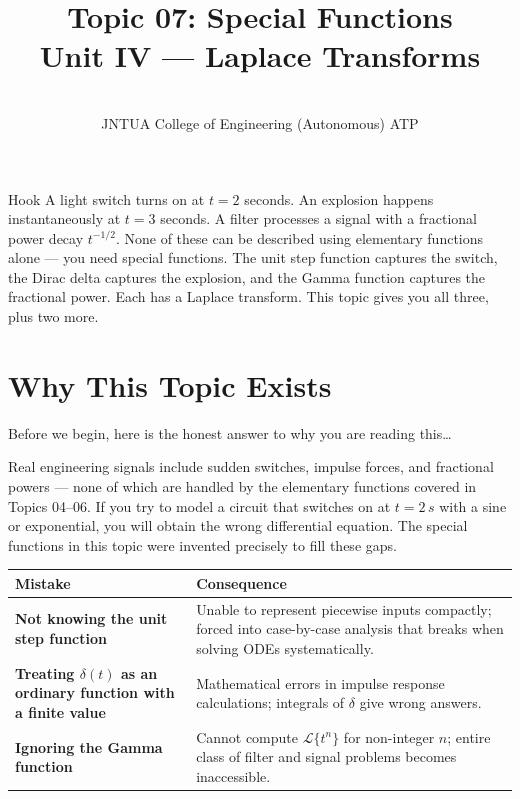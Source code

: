 \documentclass[12pt,a4paper]{article}
\title{Topic 07: Special Functions \\ \large Unit IV --- Laplace Transforms}
\author{ \\
        JNTUA College of Engineering (Autonomous) ATP}
\date{}
\begin{document}
\maketitle
\tableofcontents
\newpage

\begin{curiositybox}{Hook}
A light switch turns on at $t = 2$ seconds. An explosion happens instantaneously
at $t = 3$ seconds. A filter processes a signal with a fractional power decay
$t^{-1/2}$. None of these can be described using elementary functions
alone --- you need special functions. The unit step function captures the switch,
the Dirac delta captures the explosion, and the Gamma function captures the
fractional power. Each has a Laplace transform. This topic gives you all three,
plus two more.
\end{curiositybox}

\section{Why This Topic Exists}

Before we begin, here is the honest answer to why you are reading this\ldots

Real engineering signals include sudden switches, impulse forces, and fractional
powers --- none of which are handled by the elementary functions covered in
Topics 04--06. If you try to model a circuit that switches on at $t = 2\,s$ with
a sine or exponential, you will obtain the wrong differential equation. The
special functions in this topic were invented precisely to fill these gaps.

\medskip
\begin{center}
\begin{tabular}{>{\bfseries}p{6cm} p{8cm}}
\toprule
Mistake & Consequence \\
\midrule
Not knowing the unit step function &
  Unable to represent piecewise inputs compactly; forced into case-by-case
  analysis that breaks when solving ODEs systematically. \\
\midrule
Treating $\delta(t)$ as an ordinary function with a finite value &
  Mathematical errors in impulse response calculations; integrals of $\delta$
  give wrong answers. \\
\midrule
Ignoring the Gamma function &
  Cannot compute $\mathcal{L}\{t^n\}$ for non-integer $n$; entire class of
  filter and signal problems becomes inaccessible. \\
\bottomrule
\end{tabular}
\end{center}
\end{document}
